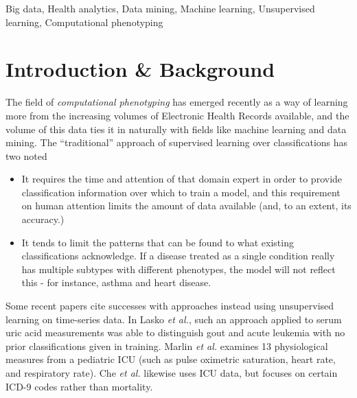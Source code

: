 \documentclass[journal]{IEEEtran}
\begin{document}
\begin{IEEEkeywords}
Big data, Health analytics, Data mining, Machine learning,
Unsupervised learning, Computational phenotyping
\end{IEEEkeywords}
%

\section{Introduction \& Background}

The field of \emph{computational phenotyping}\cite{Che2015} has
emerged recently as a way of learning more from the increasing volumes
of Electronic Health Records available, and the volume of this data
ties it in naturally with fields like machine learning and data
mining.  The ``traditional'' approach of supervised learning over
classifications has two noted 

\begin{itemize}
\item{It requires the time and attention of that domain expert in
  order to provide classification information over which to train a
  model, and this requirement on human attention limits the amount of
  data available (and, to an extent, its accuracy.)}
\item{It tends to limit the patterns that can be found to what
  existing classifications acknowledge.  If a disease treated as a
  single condition really has multiple subtypes with different
  phenotypes, the model will not reflect this - for instance, asthma
  and heart disease\cite{Lasko2013}.}
\end{itemize}

Some recent papers\cite{Marlin,Lasko2013,Johnson2016} cite
successes with approaches instead using unsupervised learning on
time-series data.  In Lasko \emph{et al.}\cite{Lasko2013}, such an
approach applied to serum uric acid measurements was able to
distinguish gout and acute leukemia with no prior classifications
given in training.  Marlin \emph{et al.}\cite{Marlin} examines 13
physiological measures from a pediatric ICU (such as pulse oximetric
saturation, heart rate, and respiratory rate). Che \emph{et
  al.}\cite{Che2015} likewise uses ICU data, but focuses on certain
ICD-9 codes rather than mortality.
\end{document}
